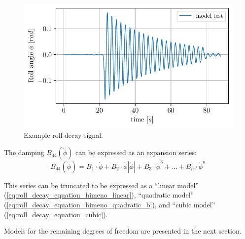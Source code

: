 \begin{figure}[H]
    \centering
    \includegraphics[width=0.7\linewidth]{kappa/images/rolldecay_example.pdf}
    \caption{Example roll decay signal.}
    \label{fig:rolldecay}
\end{figure}

\noindent The damping $B_{44}\left(\dot{\phi}\right)$ can be expressed as an expansion series:  
\begin{equation}
    B_{44}\left(\dot{\phi}\right) = B_1\cdot\dot{\phi} + B_2\cdot\dot{\phi}\left|\dot{\phi}\right| + B_3\cdot\dot{\phi}^3 + ... + B_n\cdot\dot{\phi}^n
\end{equation}
 
\noindent This series can be truncated to be expressed as a ``linear model'' (\autoref{eq:roll_decay_equation_himeno_linear}), ``quadratic model'' (\autoref{eq:roll_decay_equation_himeno_quadratic_b}), and ``cubic model'' (\autoref{eq:roll_decay_equation_cubic}).




Models for the remaining degrees of freedom are presented in the next section.


